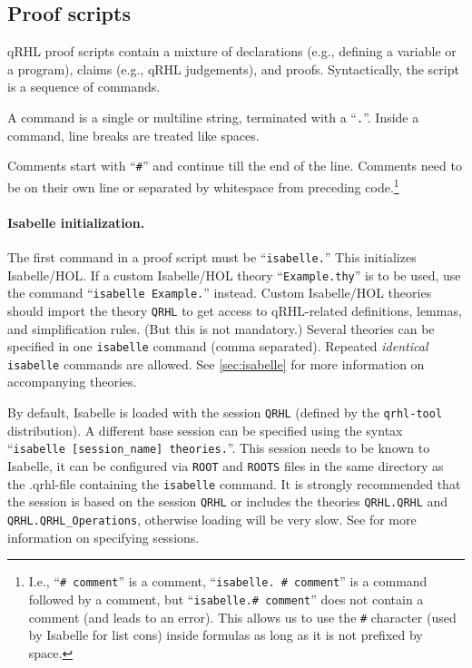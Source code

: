 \documentclass{article}
\makeatletter
\newcommand\toolidx[1]{\index{#1@\textttOLD{#1} (tool command)}}
\makeatother
\begin{document}
\subsection{Proof scripts}
\label{sec:tool.proofscripts}

qRHL proof scripts contain a mixture of declarations (e.g., defining a
variable or a program), claims (e.g., qRHL judgements), and proofs.
Syntactically, the script is a sequence of commands.

A command is a single or multiline string, terminated with a
``\texttt{.}''.
Inside a command, line breaks are treated like spaces.

Comments start with ``\texttt{\#}'' and continue till the end of the line.
Comments need to be on their own line or separated by whitespace from preceding code.\footnote{%
  I.e., ``\texttt{\# comment}'' is a comment, ``\texttt{isabelle. \# comment}'' is a command followed by a comment,
  but ``\texttt{isabelle.\# comment}'' does not contain a comment (and leads to an error).
  This allows us to use the \texttt{\#} character (used by Isabelle for list cons) inside formulas as long as it is not prefixed by space.}

\paragraph{Isabelle initialization.} The first command in a proof
script must be ``\texttt{isabelle.}''\toolidx{isabelle} This
initializes Isabelle/HOL. If a
custom Isabelle/HOL theory ``\texttt{Example.thy}'' is to be used, use
the command ``\texttt{isabelle Example.}'' instead.
Custom Isabelle/HOL theories should import the theory \texttt{QRHL} to get
access to qRHL-related definitions, lemmas, and simplification rules.
(But this is not mandatory.)
Several theories can be specified in one \texttt{isabelle} command (comma separated). 
Repeated \emph{identical} \texttt{isabelle} commands are allowed.
See \autoref{sec:isabelle} for more information on accompanying theories.

By default, Isabelle is loaded with the session \texttt{QRHL} (defined by the \texttt{qrhl-tool} distribution).
A different base session can be specified using the syntax ``\texttt{isabelle [session\_name] theories.}''.
This session needs to be known to Isabelle, it can be configured via \texttt{ROOT} and \texttt{ROOTS} files in the same directory as the .qrhl-file containing the \texttt{isabelle} command.
It is strongly recommended that the session is based on the session \texttt{QRHL} or includes the theories \texttt{QRHL.QRHL} and \texttt{QRHL.QRHL\_Operations}, otherwise loading will be very slow.
See \cite{isabelle-system} for more information on specifying sessions.
\end{document}

